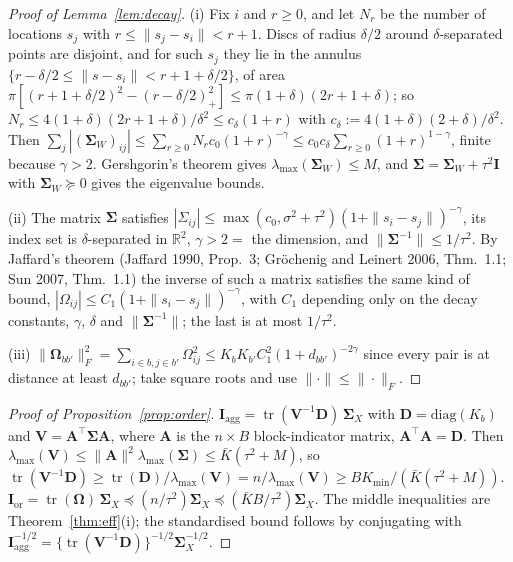 \documentclass[11pt]{article}
\theoremstyle{definition}
\newcommand{\bV}{\mathbf{V}}
\newcommand{\bD}{\mathbf{D}}
\newcommand{\bI}{\mathbf{I}}
\newcommand{\bSig}{\boldsymbol{\Sigma}}
\newcommand{\bOm}{\boldsymbol{\Omega}}
\newcommand{\tr}{\operatorname{tr}}
\newcommand{\agg}{\mathrm{agg}}
\newcommand{\orc}{\mathrm{or}}
\begin{document}
\begin{proof}[Proof of Lemma~\ref{lem:decay}]
(i) Fix $i$ and $r\ge0$, and let $N_r$ be the number of locations $s_j$ with $r\le\|s_j-s_i\|<r+1$. Discs of radius $\delta/2$ around $\delta$-separated points are disjoint, and for such $s_j$ they lie in the annulus $\{r-\delta/2\le\|s-s_i\|<r+1+\delta/2\}$, of area $\pi[(r+1+\delta/2)^2-(r-\delta/2)_+^2]\le\pi(1+\delta)(2r+1+\delta)$; so $N_r\le4(1+\delta)(2r+1+\delta)/\delta^2\le c_\delta(1+r)$ with $c_\delta:=4(1+\delta)(2+\delta)/\delta^2$. Then $\sum_j|(\bSig_W)_{ij}|\le\sum_{r\ge0}N_rc_0(1+r)^{-\gamma}\le c_0c_\delta\sum_{r\ge0}(1+r)^{1-\gamma}$, finite because $\gamma>2$. Gershgorin's theorem gives $\lambda_{\max}(\bSig_W)\le M$, and $\bSig=\bSig_W+\tau^2\bI$ with $\bSig_W\succeq0$ gives the eigenvalue bounds.

(ii) The matrix $\bSig$ satisfies $|\Sigma_{ij}|\le\max(c_0,\sigma^2+\tau^2)(1+\|s_i-s_j\|)^{-\gamma}$, its index set is $\delta$-separated in $\mathbb R^2$, $\gamma>2=$ the dimension, and $\|\bSig^{-1}\|\le1/\tau^2$. By Jaffard's theorem (Jaffard 1990, Prop.~3; Gr\"ochenig and Leinert 2006, Thm.~1.1; Sun 2007, Thm.~1.1) the inverse of such a matrix satisfies the same kind of bound, $|\Omega_{ij}|\le C_1(1+\|s_i-s_j\|)^{-\gamma}$, with $C_1$ depending only on the decay constants, $\gamma$, $\delta$ and $\|\bSig^{-1}\|$; the last is at most $1/\tau^2$.

(iii) $\|\bOm_{bb'}\|_F^2=\sum_{i\in b,j\in b'}\Omega_{ij}^2\le K_bK_{b'}C_1^2(1+d_{bb'})^{-2\gamma}$ since every pair is at distance at least $d_{bb'}$; take square roots and use $\|\cdot\|\le\|\cdot\|_F$.
\end{proof}

\begin{proof}[Proof of Proposition~\ref{prop:order}]
$\mathbf I_\agg=\tr(\bV^{-1}\bD)\,\bSig_X$ with $\bD=\mathrm{diag}(K_b)$ and $\bV=\mathbf A^\top\bSig\mathbf A$, where $\mathbf A$ is the $n\times B$ block-indicator matrix, $\mathbf A^\top\mathbf A=\bD$. Then $\lambda_{\max}(\bV)\le\|\mathbf A\|^2\lambda_{\max}(\bSig)\le\bar K(\tau^2+M)$, so $\tr(\bV^{-1}\bD)\ge\tr(\bD)/\lambda_{\max}(\bV)=n/\lambda_{\max}(\bV)\ge BK_{\min}/(\bar K(\tau^2+M))$. $\mathbf I_\orc=\tr(\bOm)\,\bSig_X\preceq(n/\tau^2)\bSig_X\preceq(\bar KB/\tau^2)\bSig_X$. The middle inequalities are Theorem~\ref{thm:eff}(i); the standardised bound follows by conjugating with $\mathbf I_\agg^{-1/2}=\{\tr(\bV^{-1}\bD)\}^{-1/2}\bSig_X^{-1/2}$.
\end{proof}
\end{document}
